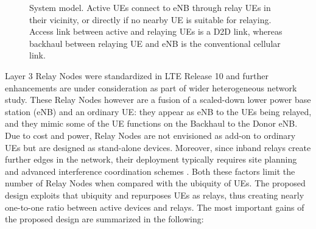 \documentclass[journal]{IEEEtran}
\begin{document}
\begin{figure}
\centering
{}
\vspace{-0.1in}
\caption{System model. Active UEs connect to eNB through relay UEs in their vicinity, or directly if no nearby UE is suitable for relaying. Access link between active and relaying UEs is a D2D link, whereas backhaul between relaying UE and eNB is the conventional cellular link.}
\label{fig:sysModel}
\vspace{-0.2in}
\end{figure}


Layer 3 Relay Nodes were standardized in LTE Release 10 \cite[Sec.~4.7]{3GPP36300Rel10} and further enhancements are under consideration as part of wider heterogeneous network study.  These Relay Nodes however are a fusion of a scaled-down lower power base station (eNB) and an ordinary UE: they appear as eNB to the UEs being relayed, and they mimic some of the UE functions on the Backhaul to the Donor eNB.  Due to cost and power, Relay Nodes are not envisioned as add-on to ordinary UEs but are designed as stand-alone devices.  Moreover, since inband relays create further edges in the network, their deployment typically requires site planning \cite{BulakciSalehHama12} and advanced interference coordination schemes \cite{DamnjanovicMontojoTingfang11}.  Both these factors limit the number of Relay Nodes when compared with the ubiquity of UEs.  The proposed design exploits that ubiquity and repurposes UEs as relays, thus creating nearly one-to-one ratio between active devices and relays.
The most important gains of the proposed design are summarized in the following:
\end{document}
